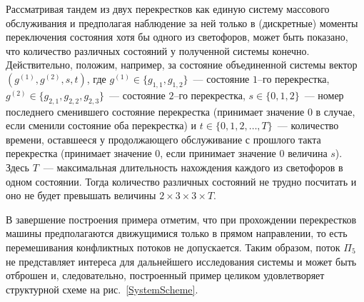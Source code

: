 \documentclass{report}
\begin{document}
Рассматривая тандем из двух перекрестков как единую систему массового обслуживания и предполагая наблюдение за ней только в (дискретные) моменты переключения состояния хотя бы одного из светофоров, может быть показано, что количество различных состояний у полученной системы конечно. Действительно, положим, например, за состояние объединенной системы вектор $(g^{(1)},g^{(2)}, s, t)$, где $g^{(1)}\in \{g_{1,1},g_{1,2}\}$~--- состояние $1$--го перекрестка, $g^{(2)}\in \{g_{2,1},g_{2,2},g_{2,3}\}$~--- состояние $2$--го перекрестка, $s \in \{0, 1, 2\}$~--- номер последнего сменившего состояние перекрестка (принимает значение $0$ в случае, если сменили состояние оба перекрестка) и $t \in \{0, 1, 2, \ldots, T\}$~--- количество времени, оставшееся у продолжающего обслуживание с прошлого такта перекрестка (принимает значение $0$, если принимает значение $0$ величина $s$). Здесь $T$~--- максимальная длительность нахождения каждого из светофоров в одном состоянии. Тогда количество различных состояний не трудно посчитать и оно не будет превышать величины  $2\times 3 \times 3 \times T$.

В завершение построения примера отметим, что при прохождении перекрестков машины предполагаются движущимися только в прямом направлении, то есть перемешивания конфликтных потоков не допускается. Таким образом, поток $\Pi_5$ не представляет интереса для дальнейшего исследования системы и может быть отброшен и, следовательно, построенный пример целиком удовлетворяет структурной схеме на рис.~\ref{SystemScheme}.
\end{document}
